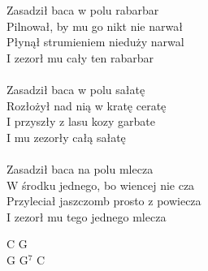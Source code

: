 \documentclass[a5paper, 10pt]{book}
\begin{document}
\begin{minipage}[t]{0.8\textwidth}
Zasadził baca w polu rabarbar\\
Pilnował, by mu go nikt nie narwał\\
Płynął strumieniem nieduży narwal\\
I zezorł mu cały ten rabarbar\\
\\
Zasadził baca w polu sałatę\\
Rozłożył nad nią w kratę ceratę\\
I przyszły z lasu kozy garbate\\
I mu zezorły całą sałatę\\
\\
Zasadził baca na polu mlecza\\
W środku jednego, bo wiencej nie cza\\
Przyleciał jaszczomb prosto z powiecza\\
I zezorł mu tego jednego mlecza\\

\end{minipage}
\begin{minipage}[t]{0.2\textwidth}
C G\\
G G$^7$ C\\
\end{minipage}

\newpage
\end{document}
